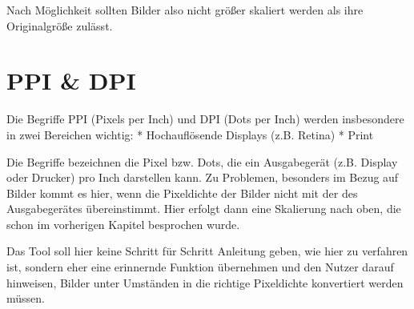 Nach Möglichkeit sollten Bilder also nicht größer skaliert werden als ihre Originalgröße zulässt.


\section{PPI \& DPI}
Die Begriffe PPI (Pixels per Inch) und DPI (Dots per Inch) werden insbesondere in zwei Bereichen wichtig:
* Hochauflösende Displays (z.B. Retina)
* Print

Die Begriffe bezeichnen die Pixel bzw. Dots, die ein Ausgabegerät (z.B. Display oder Drucker) pro Inch darstellen kann. Zu Problemen, besonders im Bezug auf Bilder kommt es hier, wenn die Pixeldichte der Bilder nicht mit der des Ausgabegerätes übereinstimmt. Hier erfolgt dann eine Skalierung nach oben, die schon im vorherigen Kapitel besprochen wurde.

Das Tool soll hier keine Schritt für Schritt Anleitung geben, wie hier zu verfahren ist, sondern eher eine erinnernde Funktion übernehmen und den Nutzer darauf hinweisen, Bilder unter Umständen in die richtige Pixeldichte konvertiert werden müssen.
